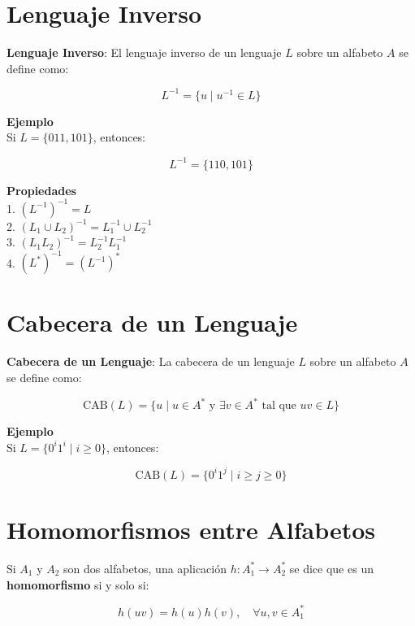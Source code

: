 \documentclass[12pt]{report} %
\begin{document}
\hypertarget{lenguaje-inverso}{%
\section{Lenguaje Inverso}\label{lenguaje-inverso}}

\begin{definicion}
\textbf{Lenguaje Inverso}: El lenguaje inverso de un lenguaje $L$ sobre un alfabeto $A$ se define como:

$$
L^{-1} = \{u \mid u^{-1} \in L\}
$$
\end{definicion}

\textbf{Ejemplo}\\
Si \(L = \{011, 101\}\), entonces:

\[
L^{-1} = \{110, 101\}
\]

\textbf{Propiedades}\\
1. \((L^{-1})^{-1} = L\)\\
2. \((L_1 \cup L_2)^{-1} = L_1^{-1} \cup L_2^{-1}\)\\
3. \((L_1L_2)^{-1} = L_2^{-1}L_1^{-1}\)\\
4. \((L^*)^{-1} = (L^{-1})^*\)

\hypertarget{cabecera-de-un-lenguaje}{%
\section{Cabecera de un Lenguaje}\label{cabecera-de-un-lenguaje}}

\begin{definicion}
\textbf{Cabecera de un Lenguaje}: La cabecera de un lenguaje $L$ sobre un alfabeto $A$ se define como:

$$
\text{CAB}(L) = \{u \mid u \in A^* \text{ y } \exists v \in A^* \text{ tal que } uv \in L\}
$$
\end{definicion}

\textbf{Ejemplo}\\
Si \(L = \{0^i1^i \mid i \geq 0\}\), entonces:

\[
\text{CAB}(L) = \{0^i1^j \mid i \geq j \geq 0\}
\]

\hypertarget{homomorfismos-entre-alfabetos}{%
\section{Homomorfismos entre
Alfabetos}\label{homomorfismos-entre-alfabetos}}

\begin{definicion}
Si $A_1$ y $A_2$ son dos alfabetos, una aplicación $h : A_1^* \to A_2^*$ se dice que es un \textbf{homomorfismo} si y solo si:

$$
h(uv) = h(u)h(v), \quad \forall u, v \in A_1^*
$$
\end{definicion}
\end{document}
